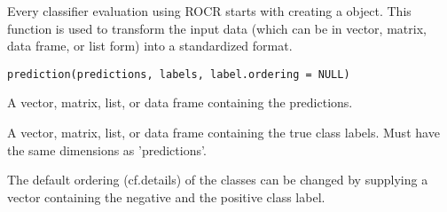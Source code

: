 \begin{Description}\relax
Every classifier evaluation using ROCR starts with
creating a  object. This function is used to
transform the input data (which can be in vector, matrix, data frame, or
list form) into a standardized format.
\end{Description}
\begin{Usage}
\begin{verbatim}
prediction(predictions, labels, label.ordering = NULL)
\end{verbatim}
\end{Usage}
\begin{Arguments}
\begin{ldescription}
\item[\code{predictions}] A vector, matrix, list, or data frame containing
the predictions.
\item[\code{labels}] A vector, matrix, list, or data frame containing the
true class labels. Must have the same dimensions as 'predictions'.
\item[\code{label.ordering}] The default
ordering (cf.details)  of the classes can be changed by supplying a vector
containing the negative and the positive class label.
\end{ldescription}
\end{Arguments}
